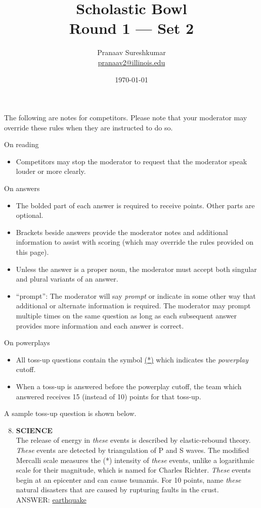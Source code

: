 \documentclass{report}
\title{\textbf{Scholastic Bowl} \\ Round 1 --- Set 2}
\author{Pranaav Sureshkumar \\ \href{mailto:pranaav2@illinois.edu}{pranaav2@illinois.edu}}
\date{\today}
\begin{document}
\thispagestyle{empty}
The following are notes for competitors. Please note that your moderator may override these rules when they are instructed to do so.

\vspace*{0.3 cm}
On reading
\begin{itemize}
    \item Competitors may stop the moderator to request that the moderator speak louder or more clearly.
\end{itemize}

\vspace*{0.3 cm}
On answers
\begin{itemize}
    \item The bolded part of each answer is required to receive points. Other parts are optional.
    \item Brackets beside answers provide the moderator notes and additional information to assist with scoring (which may override the rules provided on this page).
    \item Unless the answer is a proper noun, the moderator must accept both singular and plural variants of an answer. 
    \item ``prompt'': The moderator will say \textit{prompt} or indicate in some other way that additional or alternate information is required. The moderator may prompt multiple times on the same question as long as each subsequent answer provides more information and each answer is correct.
\end{itemize}

\vspace*{0.3 cm}
On powerplays
\begin{itemize}
    \item All toss-up questions contain the symbol \underline{(*)} which indicates the \textit{powerplay} cutoff.
    \item When a toss-up is answered before the powerplay cutoff, the team which answered receives 15 (instead of 10) points for that toss-up.
\end{itemize}

\vspace*{0.3 cm}
A sample toss-up question is shown below.

\begin{mdframed}[style=sample]
    \begin{enumerate}
        \setcounter{enumi}{7}
        \item \textbf{SCIENCE} \\ The release of energy in \textit{these} events is described by elastic-rebound theory. \textit{These} events are detected by triangulation of P and S waves. The modified Mercalli scale measures the (*) intensity of \textit{these} events, unlike a logarithmic scale for their magnitude, which is named for Charles Richter. \textit{These} events begin at an epicenter and can cause tsunamis. For 10 points, name \textit{these} natural disasters that are caused by rupturing faults in the crust. \\ ANSWER: \underline{earthquake}
    \end{enumerate}
    \end{mdframed}
\end{document}

